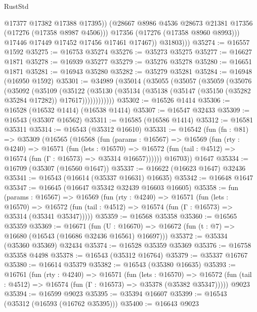 \begin{lexlean}{RustStd}
\begin{coremodule}
                    @17377
                    @17382
                    @17388
                    @17395))
                (@28667 @8986 @4536 @28673 @21381 @17356 (@17276 (@17358 @8987 @4506)))
                @17356
                (@17276 (@17358 @8960 @8993)))
              @17446
              @17449
              @17452
              @17456
              @17461
              @17467))
          @31803)))
@35274 := @16557 @1592
@35275 := @16753 @35274
@35276 := @35273 @35275
@35277 := @16627 @1871
@35278 := @16939 @35277
@35279 := @35276 @35278
@35280 := @16651 @1871
@35281 := @16943 @35280
@35282 := @35279 @35281
@35284 := @16948 (@16950 @1592)
@35301 := @34989
    (@35014
      (@35055
        (@35057
          (@35059
            (@35076
              (@35092
                (@35109
                  (@35122
                    (@35130
                      (@35134 (@35138 (@35147 (@35150 (@35282 @35284 @17282)) @17617))))))))))))
@35302 := @16526 @1414
@35306 := @16528 (@16532 @1414) (@16538 @1414)
@35307 := @16547 @32433
@35309 := @16543 (@35307 @16562)
@35311 := @16585 (@16586 @1414)
@35312 := @16581 @35311
@35314 := @16543 (@35312 @16610)
@35331 := @16542
    (fun (fn : @81) =>
    @35309
      (@16565
        (@16568
          (fun (params : @16567) =>
          @16569
            (fun (rty : @4240) =>
            @16571
              (fun (lets : @16570) =>
              @16572 (fun (tail : @4512) => @16574 (fun (Γ : @16573) => @35314 @16657))))))
        @16703))
    @1647
@35334 := @16709 (@35307 (@16560 @1647))
@35337 := @16622 (@16623 @1647) @32436
@35341 := @16543 (@16614 (@35337 @16631) @16635)
@35342 := @16648 @1647
@35347 := @16645 (@16647 @35342 @32439 @16603 @16605)
@35358 := fun (params : @16567) =>
  @16569
    (fun (rty : @4240) =>
    @16571
      (fun (lets : @16570) =>
      @16572 (fun (tail : @4512) => @16574 (fun (Γ : @16573) => @35314 (@35341 @35347)))))
@35359 := @16568 @35358
@35360 := @16565 @35359
@35369 := @16671
    (fun (U : @16670) => @16672 (fun (t : @7) => @16680 (@16543 (@16686 @32436 @16561) @16697)))
@35372 := @35334 (@35360 @35369) @32434
@35374 := @16528 @35359 @35369
@35376 := @16758 @35358 @4498
@35378 := @16543 (@35312 @16764)
@35379 := @35337 @16767
@35380 := @16614 @35379
@35382 := @16543 (@35380 @16635)
@35393 := @16761
    (fun (rty : @4240) =>
    @16571
      (fun (lets : @16570) =>
      @16572 (fun (tail : @4512) => @16574 (fun (Γ : @16573) => @35378 (@35382 @35347)))))
    @9023
@35394 := @16599 @9023
@35395 := @35394 @16607
@35399 := @16543 (@35312 (@16593 (@16762 @35395)))
@35400 := @16643 @9023

\end{coremodule}
\end{lexlean}
